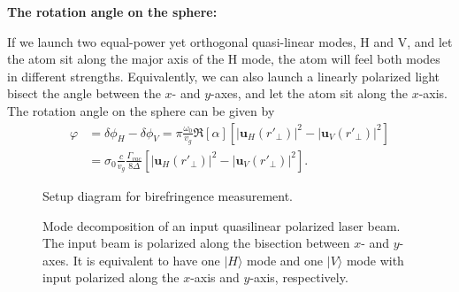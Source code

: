 \bigskip
\textbf{The rotation angle on the \Poincare sphere:}

If we launch two equal-power yet orthogonal quasi-linear modes, H and V, and let the atom sit along the major axis of the H mode, the atom will feel both modes in different strengths. Equivalently, we can also launch a linearly polarized light bisect the angle between the $ x $- and $ y $-axes, and let the atom sit along the $ x $-axis. The rotation angle on the \Poincare sphere can be given by
\begin{align}
\varphi &= \delta\phi_H-\delta\phi_V= \pi \frac{\omega_0}{v_g} \Re[\alpha] \left[| \mathbf{u}_H(r'_{\!\perp})|^2- | \mathbf{u}_V(r'_{\!\perp})|^2 \right]\\
&= \sigma_0\frac{c}{v_g}\frac{\Gamma_{vac}}{8\Delta}\left[| \mathbf{u}_H(r'_{\!\perp})|^2- | \mathbf{u}_V(r'_{\!\perp})|^2 \right].\label{eq:Faradayrotang}
\end{align}

\begin{figure}
\centering{}
\caption{Setup diagram for birefringence measurement.}
\end{figure}

\begin{figure}
\centering{}
\caption{Mode decomposition of an input quasilinear polarized laser beam. The input beam is polarized along the bisection between $ x $- and $ y $-axes. It is equivalent to have one $ |H\rangle $ mode and one $ |V\rangle $ mode with input polarized along the $ x $-axis and $ y $-axis, respectively.}
\end{figure}

